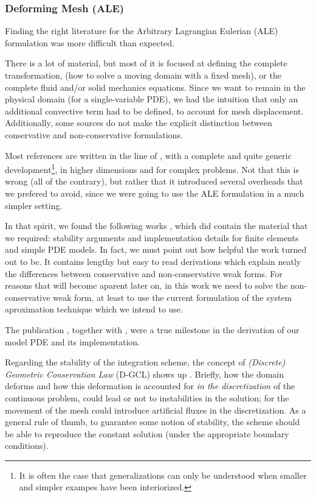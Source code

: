 \documentclass[thesis.tex]{subfiles}
\begin{document}
\subsubsection{Deforming Mesh (ALE)}
\label{sec:literature_review_deforming_mesh}
Finding the right literature for the Arbitrary Lagrangian Eulerian (ALE) formulation 
was more difficult than expected.

There is a lot of material, 
but most of it is focused at defining the complete transformation,
(how to solve a moving domain with a fixed mesh),
or the complete fluid and/or solid mechanics equations.
Since we want to remain in the physical domain
(for a \mbox{single-variable} PDE),
we had the intuition that only
an additional convective term had to be defined, 
to account for mesh displacement.
Additionally, some sources do not make the explicit distinction between
conservative and non-conservative formulations.

Most references are written in the line of 
\cite{doneaALE,
DONEA1982689},
with a complete and quite generic development\footnote{
    It is often the case that generalizations can only be understood
    when smaller and simpler exampes have been interiorized.
}, 
in higher dimensions and for complex problems.
Not that this is wrong 
(all of the contrary), 
but rather that it introduced several overheads that we prefered to avoid,
since we were going to use the ALE formulation in a much simpler setting.

In that spirit, 
we found the following works 
\cite{formaggiaALE,
formaggiaALE_secondOrder,
FSIPistonProblem},
which did contain the material that we required:
stability arguments and implementation details for finite elements
and simple PDE models.
In fact, we must point out how helpful the work \cite{formaggiaALE}
turned out to be.
It contains lengthy but easy to read derivations which explain neatly
the differences between conservative and non-conservative weak forms.
For reasons that will become aparent later on,
in this work we need to solve the non-conservative weak form,
at least to use the current formulation of the system aproximation technique which 
we intend to use.

The publication \cite{formaggiaALE}, together with \cite{FSIPistonProblem}, 
were a true milestone in the derivation of our model PDE and its implementation.

Regarding the stability of the integration scheme,
the concept of \textit{(Discrete) Geometric Conservation Law} (D-GCL) shows up 
\cite{HUGHES2000467,
GUILLARD20001467,
FARHAT2001669,
LESOINNE199671}.
Briefly, how the domain deforms and how this deformation is accounted for
\textit{in the discretization} of the continuous problem,
could lead or not to instabilities in the solution; 
for the movement of the mesh could introduce artificial fluxes in the discretization.
As a general rule of thumb, 
to guarantee some notion of stability,
the scheme should be able to reproduce the constant solution 
(under the appropriate boundary conditions).
\end{document}
